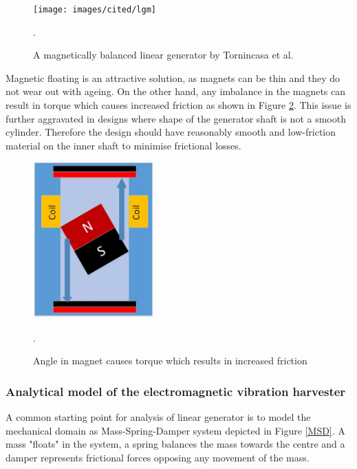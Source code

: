 \begin{figure}[htb]
\begin{center}
\texttt{[image: images/cited/lgm]}
\end{center}
\caption{A magnetically balanced linear generator by Tornincasa et al. \cite{Tornincasa2012}}.
\label{lgm}
\end{figure}

Magnetic floating is an attractive solution, as magnets can be thin and they do not wear out with ageing. On the other hand, any imbalance in the magnets can result in torque which causes increased friction as shown in Figure \ref{fig:lg_torgue}. This issue is further aggravated in designs where shape of the generator shaft is not a smooth cylinder. Therefore the design should have reasonably smooth and low-friction material on the inner shaft to minimise frictional losses.

\begin{figure}[htb]
\begin{center}
\includegraphics[height=6cm]{images/own_dwg/generator_torgue}
\end{center}
\caption{Angle in magnet causes torque which results in increased friction}.
\label{fig:lg_torgue}
\end{figure}



\subsubsection{Analytical model of the electromagnetic vibration harvester}
A common starting point for analysis of linear generator is to model the mechanical domain as Mass-Spring-Damper system depicted in Figure \ref{MSD}. A mass "floats" in the system, a spring balances the mass towards the centre and a damper represents frictional forces opposing any movement of the mass. 

